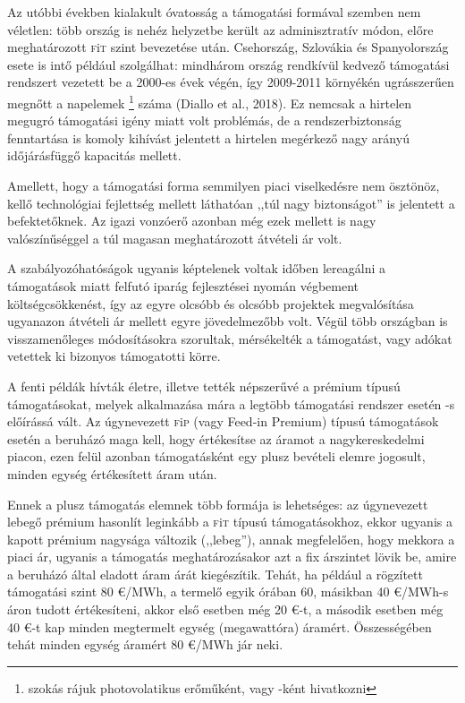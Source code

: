 \documentclass[twoside, magyar, showtrims]{corvinusphd}
\theoremstyle{plain}
\theoremstyle{remark}
\theoremstyle{definition}
\newcommand{\fit}{\textsc{f}i\textsc{t}\index{\textsc{f}i\textsc{t}} }
\newcommand{\fip}{\textsc{f}i\textsc{p}\index{\textsc{f}i\textsc{p}} }
\begin{document}
Az utóbbi években kialakult óvatosság a
támogatási formával szemben nem véletlen:
több ország is nehéz helyzetbe került az
adminisztratív módon, előre meghatározott
\fit szint bevezetése után. Csehország, Szlovákia
és Spanyolország esete is intő például szolgálhat:
mindhárom ország rendkívül kedvező
támogatási rendszert
vezetett be a 2000-es évek végén, így 2009-2011 környékén ugrásszerűen
megnőtt a napelemek
\footnote{szokás rájuk photovolatikus erőműként, vagy -ként hivatkozni}
száma (Diallo et al., 2018).
Ez nemcsak a hirtelen megugró
támogatási igény miatt volt problémás,
de a rendszerbiztonság fenntartása
is komoly kihívást jelentett a hirtelen
megérkező nagy arányú időjárásfüggő kapacitás mellett.

Amellett, hogy a támogatási forma semmilyen
piaci viselkedésre nem ösztönöz, kellő technológiai
fejlettség mellett láthatóan ,,túl nagy biztonságot''
is jelentett a befektetőknek. Az igazi vonzóerő
azonban még ezek mellett is nagy valószínűséggel
a túl magasan meghatározott átvételi ár volt.

A szabályozóhatóságok ugyanis képtelenek voltak időben lereagálni
a támogatások miatt felfutó iparág fejlesztései nyomán végbement
költségcsökkenést, így az egyre olcsóbb és olcsóbb projektek megvalósítása
ugyanazon átvételi ár mellett egyre jövedelmezőbb volt.
Végül több országban is visszamenőleges módosításokra szorultak,
mérsékelték a támogatást, vagy adókat vetettek ki bizonyos támogatotti körre.

A fenti példák hívták életre, illetve tették
népszerűvé a prémium típusú támogatásokat,
melyek alkalmazása mára a legtöbb
támogatási rendszer esetén -s előírássá vált.
Az úgynevezett \fip (vagy Feed-in Premium)
típusú támogatások esetén a beruházó maga kell,
hogy értékesítse az áramot a nagykereskedelmi piacon,
ezen felül azonban támogatásként egy plusz bevételi elemre jogosult, 
minden egység értékesített áram után.

\label{FIP}
Ennek a plusz támogatás elemnek több formája is lehetséges:
az úgynevezett lebegő prémium hasonlít leginkább a \fit típusú
támogatásokhoz, ekkor ugyanis a kapott prémium nagysága változik (,,lebeg''),
annak megfelelően, hogy mekkora a piaci ár, ugyanis a támogatás
meghatározásakor azt a fix árszintet lövik be, amire a beruházó által
eladott áram árát kiegészítik. Tehát, ha például a rögzített támogatási szint
80 €/MWh, a termelő egyik órában 60, másikban 40 €/MWh-s áron
tudott értékesíteni, akkor első esetben még 20 €-t, a második esetben
még 40 €-t kap minden megtermelt egység (megawattóra) áramért.
Összességében tehát minden egység áramért 80 €/MWh jár neki.
\end{document}
